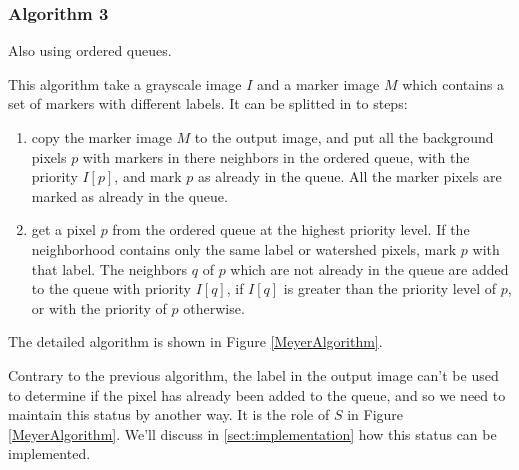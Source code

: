 \documentclass{InsightArticle}
\begin{document}
% 
% 
% 	
% 
% 
% 

\subsubsection{Algorithm 3}
Also using ordered queues.

This algorithm take a grayscale image $I$ and a marker image $M$
which contains a set of markers with different labels. It can be
splitted in to steps:
\begin{enumerate}
  \item copy the marker image $M$ to the output image, and put
all the background pixels $p$ with markers in there neighbors in the
ordered queue, with the priority $I[p]$, and mark $p$ as already in
the queue. All the marker pixels are marked as already in the queue.
  \item get a pixel $p$ from the ordered queue at the highest
priority level. If the neighborhood contains only the same label
or watershed pixels, mark $p$ with that label. The neighbors $q$ 
of $p$ which are not already in the queue are added to the queue 
with priority $I[q]$, if $I[q]$ is greater than the priority level
of $p$, or with the priority of $p$ otherwise.
\end{enumerate}

The detailed algorithm is shown in Figure \ref{MeyerAlgorithm}.

Contrary to the previous algorithm, the label in the output image
can't be used to determine if the pixel has already been added to
the queue, and so we need to maintain this status by another way.
It is the role of $S$ in Figure \ref{MeyerAlgorithm}. We'll discuss
in \ref{sect:implementation} how this status can be implemented.
\end{document}
